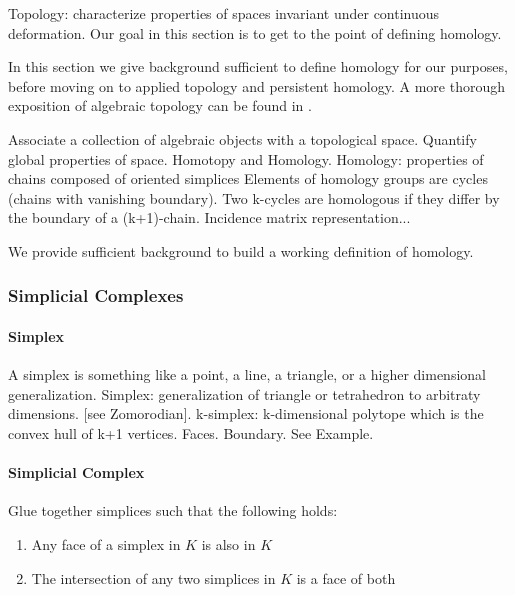 Topology: characterize properties of spaces invariant under continuous deformation.
Our goal in this section is to get to the point of defining homology.

In this section we give background sufficient to define homology for our purposes, before moving on to applied topology and persistent homology.
A more thorough exposition of algebraic topology can be found in \cite{Hatcher:2002ut}.

Associate a collection of algebraic objects with a topological space.
Quantify global properties of space.
Homotopy and Homology.
Homology: properties of chains composed of oriented simplices
Elements of homology groups are cycles (chains with vanishing boundary).
Two k-cycles are homologous if they differ by the boundary of a (k+1)-chain.
Incidence matrix representation...

We provide sufficient background to build a working definition of homology.

\subsubsection{Simplicial Complexes}

\paragraph{Simplex}

A simplex is something like a point, a line, a triangle, or a higher dimensional generalization.
Simplex: generalization of triangle or tetrahedron to arbitraty dimensions. [see Zomorodian].
k-simplex: k-dimensional polytope which is the convex hull of k+1 vertices.
Faces. Boundary.
See Example.

\begin{figure}
\centering
\caption[Simplices]{}
\label{background:fig:simplices}
\end{figure}

\paragraph{Simplicial Complex}

Glue together simplices such that the following holds:

\begin{enumerate}
\item Any face of a simplex in $K$ is also in $K$
\item The intersection of any two simplices in $K$ is a face of both 
\end{enumerate}


